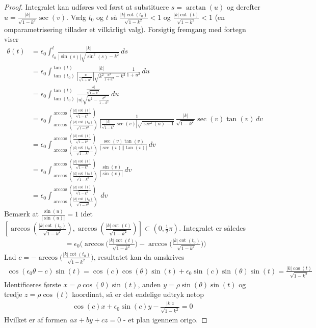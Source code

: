 \begin{proof}
\newpage
\noindent Integralet kan udføres ved først at substituere $s=\arctan(u)$ og derefter $u=\frac{|k|}{\sqrt{1-k^2}}\sec(v)$. Vælg $t_0$ og $t$ så $\frac{|k|\cot(t_0)}{\sqrt{1-k^2}}<1$ og $\frac{|k|\cot(t)}{\sqrt{1-k^2}}<1$ (en omparametrisering tillader et vilkårligt valg). Forsigtig fremgang med fortegn viser
\begin{align*}
\theta(t) &= \epsilon_0 \int_{t_0}^t \frac{|k|}{|\sin(s)|\sqrt{\sin^2(s)-k^2}} \, ds \\
&=
\epsilon_0 \int^{\tan(t)}_{\tan(t_0)} \frac{|k|}{|\frac{u}{\sqrt{1+u^2}}|\sqrt{k^2 \frac{u^2}{1+u^2}-k^2}} \frac{1}{1+u^2}\, du \\
&=
\epsilon_0 \int^{\tan(t)}_{\tan(t_0)} \frac{\frac{|k|}{\sqrt{1-k^2}}}{|u|\sqrt{u^2 -\frac{k^2}{1-k^2}}}\, du \\
&=
\epsilon_0 \int^{\arccos(\frac{|k|\cot(t)}{\sqrt{1-k^2}})}_{\arccos(\frac{|k|\cot(t_0)}{\sqrt{1-k^2}})} \frac{1}{|\frac{|k|}{\sqrt{1-k^2}}\sec(v)|\sqrt{\sec^2(u) - 1}}\, \frac{|k|}{\sqrt{1-k^2}}\sec(v)\tan(v)\, dv \\
&=
\epsilon_0 \int^{\arccos(\frac{|k|\cot(t)}{\sqrt{1-k^2}})}_{\arccos(\frac{|k|\cot(t_0)}{\sqrt{1-k^2}})} \frac{\sec(v)\tan(v)}{|\sec(v)||\tan(v)|} \, dv \\
&=
\epsilon_0 \int^{\arccos(\frac{|k|\cot(t)}{\sqrt{1-k^2}})}_{\arccos(\frac{|k|\cot(t_0)}{\sqrt{1-k^2}})} \frac{\sin(v)}{|\sin(v)|} \, dv \\
&=
\epsilon_0 \int^{\arccos(\frac{|k|\cot(t)}{\sqrt{1-k^2}})}_{\arccos(\frac{|k|\cot(t_0)}{\sqrt{1-k^2}})} \, dv
\end{align*}
Bemærk at $\frac{\sin(u)}{|\sin(u)|}=1$ idet $[\arccos(\frac{|k|\cot(t_0)}{\sqrt{1-k^2}}),\arccos(\frac{|k|\cot(t)}{\sqrt{1-k^2}})] \subset (0,\frac{1}{2}\pi)$. Integralet er således
\begin{align*}
&=
\epsilon_0 \Big(\arccos\big(\frac{|k|\cot(t)}{\sqrt{1-k^2}}\big) - \arccos\big(\frac{|k|\cot(t_0)}{\sqrt{1-k^2}}\big)\Big)
\end{align*}
Lad $c=- \arccos\big(\frac{|k|\cot(t_0)}{\sqrt{1-k^2}}\big)$, resultatet kan da omskrives  
\begin{align*}
\cos (\epsilon_0\theta - c)\sin(t) = \cos (c)\cos(\theta)\sin(t)+\epsilon_0 \sin(c)\sin(\theta) \sin(t) =
\frac{|k|\cos(t)}{\sqrt{1-k^2}} 
\end{align*}
Identificeres første $x=\rho\cos(\theta)\sin(t)$, anden $y=\rho\sin(\theta)\sin(t)$ og tredje $z=\rho\cos(t)$ koordinat, så er det endelige udtryk netop 
\begin{align*}
\cos (c)x+\epsilon_0\sin(c)y - \frac{|k|z}{\sqrt{1-k^2}}=0 
\end{align*}
Hvilket er af formen $ax+by+cz=0$ - et plan igennem origo.
\end{proof}